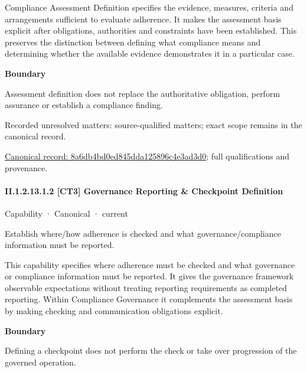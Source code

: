 Compliance Assessment Definition specifies the evidence, measures, criteria and arrangements sufficient to evaluate adherence. It makes the assessment basis explicit after obligations, authorities and constraints have been established. This preserves the distinction between defining what compliance means and determining whether the available evidence demonstrates it in a particular case.



\textbf{Boundary}



Assessment definition does not replace the authoritative obligation, perform assurance or establish a compliance finding.


{\small Recorded unresolved matters: source-qualified matters; exact scope remains in the canonical record.}\par
{\footnotesize \href{../../../../continuum/strategy/capability/8a6db4bd0ed845dda125896c4e3ad3d0.md}{Canonical record: 8a6db4bd0ed845dda125896c4e3ad3d0}; full qualifications and provenance.}\par
\paragraph*{II.1.2.13.1.2 [CT3] Governance Reporting \& Checkpoint Definition}
\label{navigation:II.1.2.13.1.2}

\label{element:0ff9f332acdc435e98f4f527c74f60c9}
{\small Capability · Canonical · current}\par

Establish where/how adherence is checked and what governance/compliance information must be reported.



This capability specifies where adherence must be checked and what governance or compliance information must be reported. It gives the governance framework observable expectations without treating reporting requirements as completed reporting. Within Compliance Governance it complements the assessment basis by making checking and communication obligations explicit.



\textbf{Boundary}



Defining a checkpoint does not perform the check or take over progression of the governed operation.


